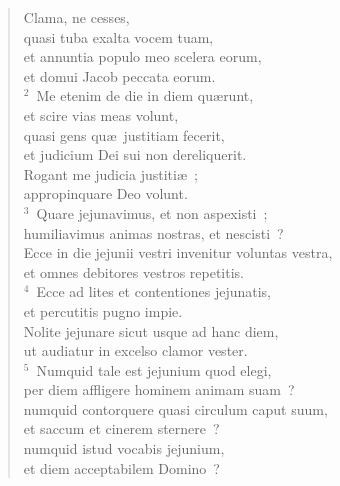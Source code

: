 \begin{flushleft}\begin{verse}\vspace{-19pt}\hspace{6pt}Clama, ne cesses,\\\hspace{6pt} quasi tuba exalta vocem tuam,\\ et annuntia populo meo scelera eorum,\\ et domui Jacob peccata eorum.\\
${}^{2}$~Me etenim de die in diem qu\ae runt,\\ et scire vias meas volunt,\\ quasi gens qu\ae\ justitiam fecerit,\\ et judicium Dei sui non dereliquerit.\\ Rogant me judicia justiti\ae~;\\ appropinquare Deo volunt.\\
${}^{3}$~Quare jejunavimus, et non aspexisti~;\\ humiliavimus animas nostras, et nescisti~?\\ Ecce in die jejunii vestri invenitur voluntas vestra,\\ et omnes debitores vestros repetitis.\\
${}^{4}$~Ecce ad lites et contentiones jejunatis,\\ et percutitis pugno impie.\\ Nolite jejunare sicut usque ad hanc diem,\\ ut audiatur in excelso clamor vester.\\
${}^{5}$~Numquid tale est jejunium quod elegi,\\ per diem affligere hominem animam suam~?\\ numquid contorquere quasi circulum caput suum,\\ et saccum et cinerem sternere~?\\ numquid istud vocabis jejunium,\\ et diem acceptabilem Domino~?\end{verse}\end{flushleft}


